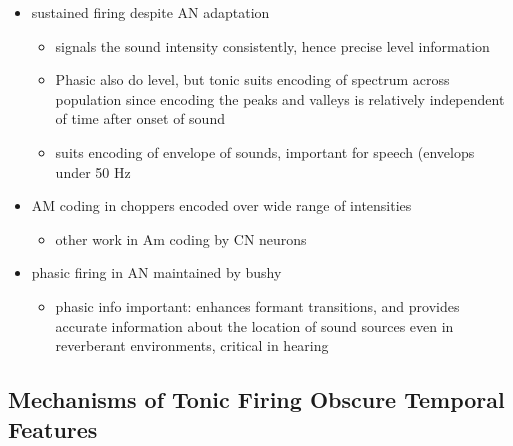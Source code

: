 \begin{itemize}
\item sustained firing despite AN adaptation
\begin{itemize}
\item signals the sound intensity consistently, hence precise level information
\item Phasic also do level, but tonic suits encoding of spectrum across population since encoding the peaks and valleys is relatively independent of time after onset of sound \citep{BlackburnSachs:1990,May:2003,MayPrellEtAl:1998,MaySachs:1998}
\item suits encoding of envelope of sounds, important for speech (envelops under 50 Hz \citep{ShannonZengEtAl:1995}
\end{itemize}
\item AM coding in choppers encoded over wide range of intensities \citep{RhodeGreenberg:1994,FrisinaSmithEtAl:1990}
\begin{itemize}
\item other work in Am coding by CN neurons  \citep{Moller:1972,Moller:1974a,Moller:1974,MooreCashin:1974,Frisina:1984,PalmerWinterEtAl:1986,KimRhodeEtAl:1986,WinterPalmer:1990a,Palmer:1990,PalmerWinter:1992,FrisinaSmithEtAl:1990a,Frisina:1983,GorodetskaiaBibikov:1985,RhodeGreenberg:1994,ShofnerSheftEtAl:1996,FrisinaKarcichEtAl:1996,DAngeloSterbingEtAl:2003,Aggarwal:2003}
\end{itemize}
\item phasic firing in AN maintained by bushy
\begin{itemize}
\item phasic info important: enhances formant transitions, and provides accurate information about the location of sound sources even in reverberant environments, critical in hearing \cite{DelgutteKiang:1984,DelgutteKiang:1984a,DelgutteKiang:1984b,DelgutteKiang:1984c,DelgutteKiang:1984d,DavoreIhlefeldEtAl:2009}
\end{itemize}
\end{itemize}


\subsection{Mechanisms of Tonic Firing Obscure Temporal Features}


